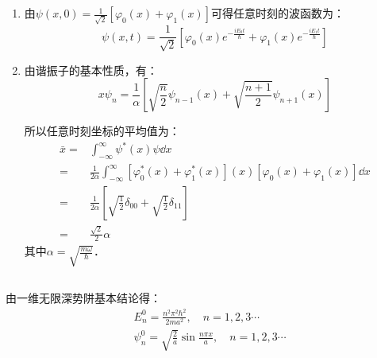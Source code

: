 \subsection{ }
\begin{enumerate}
\item 由$\displaystyle \psi (x,0) = \frac{1}{\sqrt{2}}[\varphi_{0}(x) + \varphi_{1}(x)] $可得任意时刻的波函数为：\\
\begin{equation}
\psi(x,t) = \frac{1}{\sqrt{2}}\left[\varphi_{0}(x)e^{-\frac{iE_{0}t}{\hbar}} + \varphi_{1}(x)e^{-\frac{iE_{1}t}{\hbar}} \right]
\end{equation}

\item 由谐振子的基本性质，有：\\
\begin{equation}
x\psi_{n} = \frac{1}{\alpha} \left[\sqrt{\frac{n}{2}}\psi_{n-1}(x) + \sqrt{\frac{n+1}{2}}\psi_{n+1}(x) \right]
\end{equation}

所以任意时刻坐标的平均值为：\\
\begin{equation}
\begin{aligned}
\bar{x} =& \int^{\infty}_{-\infty} \psi^{*}(x)\psi \dd{x} \\
=& \frac{1}{2\alpha} \int^{\infty}_{-\infty} \left[\varphi^{*}_{0}(x)+\varphi^{*}_{1}(x)\right](x)\left[\varphi_{0}(x)+\varphi_{1}(x)\right] \dd{x} \\
=& \frac{1}{2\alpha} \left[\sqrt{\frac{1}{2}}\delta_{00}+\sqrt{\frac{1}{2}}\delta_{11} \right] \\
=& \frac{\sqrt{2}}{2} \alpha
\end{aligned}
\end{equation}
其中$\displaystyle \alpha = \sqrt{\frac{m\omega}{\hbar}} $．
\end{enumerate}
\subsection{ }
由一维无限深势阱基本结论得：\\
\begin{equation}
\begin{aligned}
& E^{0}_{n} = \frac{n^{2} \pi^{2} \hbar^{2}}{2ma^{2}},\quad n = 1,2,3\cdots \\
& \psi^{0}_{n} = \sqrt{\frac{2}{a}} \sin{\frac{n \pi x}{a}},\quad n = 1,2,3\cdots
\end{aligned}
\end{equation}

